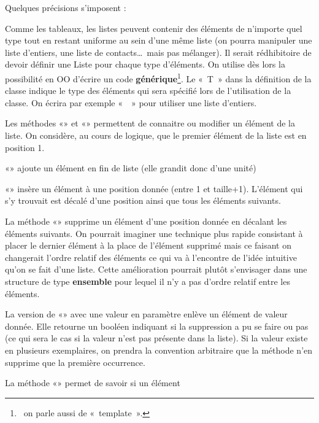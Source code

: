 \bigskip

Quelques précisions s’imposent :
\begin{liste}
	\item 
		Comme les tableaux, les listes peuvent contenir des éléments de
		n’importe quel type tout en restant uniforme au sein d’une même liste
		(on pourra manipuler une liste d’entiers, une liste de contacts\dots\ 
		mais pas mélanger). Il serait rédhibitoire de devoir définir une Liste
		pour chaque type d’éléments. On utilise dès lors la possibilité en OO
		d’écrire un code \textbf{générique}\footnote{\ on parle aussi de
		«~template~».}. Le «~T~» dans la définition de la classe indique le
		type des éléments qui sera spécifié lors de l’utilisation de la classe.
		On écrira par exemple «~\pseudocode{Liste d’entiers}~» pour
		utiliser une liste d’entiers.
	\item 
		Les méthodes «» et «»
		permettent de connaitre ou modifier un élément de la liste. On
		considère, au cours de logique, que le premier élément de 
		la liste est en position 1.
	\item 
		«» ajoute un élément en fin de liste (elle
		grandit donc d’une unité)
	\item 
		«» insère un élément à une position donnée
		(entre 1 et taille+1). L’élément qui s’y trouvait est décalé
		d'une position ainsi que tous les éléments suivants.
	\item 
		La méthode «»
		supprime un élément d'une position donnée en
		décalant les éléments suivants. On pourrait imaginer une technique plus
		rapide consistant à placer le dernier élément à la place de l’élément
		supprimé mais ce faisant on changerait l’ordre relatif des éléments ce
		qui va à l’encontre de l’idée intuitive qu’on se fait d’une liste.
		Cette amélioration pourrait plutôt s’envisager dans une structure de
		type \textbf{ensemble} pour lequel il n’y a pas d’ordre relatif entre
		les éléments.
	\item 
		La version de «» avec une valeur en
		paramètre enlève un élément de valeur donnée. Elle retourne un booléen
		indiquant si la suppression a pu se faire ou pas (ce qui sera le cas si
		la valeur n’est pas présente dans la liste). Si la valeur existe en
		plusieurs exemplaires, on prendra la convention arbitraire que
		la méthode n’en supprime que la première	occurrence.
	\item 
		La méthode «» permet de savoir si un élément

\end{liste}
